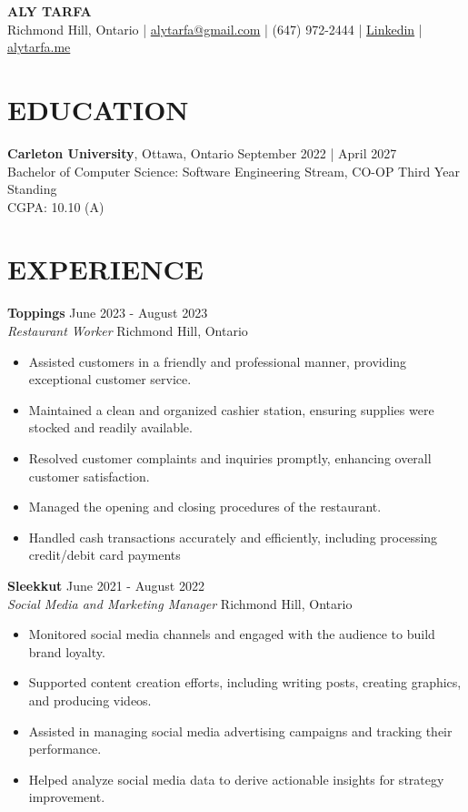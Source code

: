 \documentclass[a4paper,10pt]{extarticle}
\begin{document}
\pagestyle{empty}

\begin{center}
	\textbf{\Large ALY TARFA}\\[2pt]
	Richmond Hill, Ontario | \href{mailto:alytarfa@gmail.com}{alytarfa@gmail.com} | (647) 972-2444 | \href{https://www.linkedin.com/in/aly-tarfa-b18b59225/}{Linkedin} | \href{https://alytarfa.me/}{alytarfa.me}
\end{center}

\section*{EDUCATION}
\noindent
\textbf{Carleton University}, Ottawa, Ontario \hfill September 2022 | April 2027\\
Bachelor of Computer Science: Software Engineering Stream, CO-OP \hfill Third Year Standing\\
CGPA: 10.10 (A)

\section*{EXPERIENCE}

\noindent
\textbf{Toppings} \hfill June 2023 - August 2023\\
\textit{Restaurant Worker} \hfill Richmond Hill, Ontario
\begin{itemize}
	\item Assisted customers in a friendly and professional manner, providing exceptional customer service.
	\item Maintained a clean and organized cashier station, ensuring supplies were stocked and readily available.
    \item Resolved customer complaints and inquiries promptly, enhancing overall customer satisfaction.
    \item Managed the opening and closing procedures of the restaurant.
    \item Handled cash transactions accurately and efficiently, including processing credit/debit card payments
\end{itemize}

\noindent
\textbf{Sleekkut} \hfill June 2021 - August 2022\\
\textit{Social Media and Marketing Manager} \hfill Richmond Hill, Ontario
\begin{itemize}
	\item Monitored social media channels and engaged with the audience to build brand loyalty.
    \item Supported content creation efforts, including writing posts, creating graphics, and producing videos.
    \item Assisted in managing social media advertising campaigns and tracking their performance.
    \item Helped analyze social media data to derive actionable insights for strategy improvement.
\end{itemize}
\end{document}
